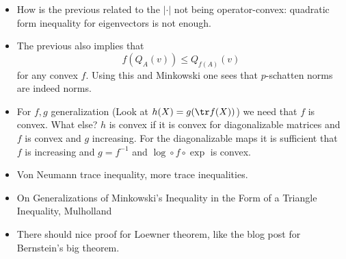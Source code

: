 \begin{itemize}
	\item How is the previous related to the $|\cdot|$ not being operator-convex: quadratic form inequality for eigenvectors is not enough.
	\item The previous also implies that
	\[
		f(Q_{A}(v)) \leq Q_{f(A)}(v)
	\]
	for any convex $f$. Using this and Minkowski one sees that $p$-schatten norms are indeed norms.
	\item For $f, g$ generalization (Look at $h(X) = g (\tr f(X))$) we need that $f$ is convex. What else? $h$ is convex if it is convex for diagonalizable matrices and $f$ is convex and $g$ increasing. For the diagonalizable maps it is sufficient that $f$ is increasing and $g = f^{-1}$ and $\log \circ f \circ \exp$ is convex.
	\item Von Neumann trace inequality, more trace inequalities.
	\item On Generalizations of Minkowski's Inequality in the Form of a Triangle Inequality, Mulholland
	\item There should nice proof for Loewner theorem, like the blog post for Bernstein's big theorem.
\end{itemize}
